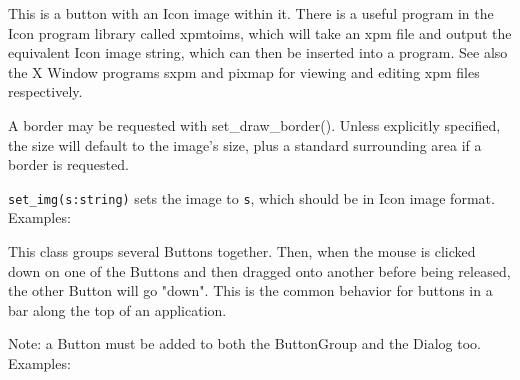 

This is a button with an Icon image within it. There is a useful program
in the Icon program library called xpmtoims, which will take an xpm
file and output the equivalent Icon image string, which can then be
inserted into a program. See also the X Window programs sxpm and pixmap
for viewing and editing xpm files respectively.

A border may be requested with set\_draw\_border(). Unless explicitly
specified, the size will default to the image's size,
plus a standard surrounding area if a border is requested.

\texttt{set\_img(s:string)} sets the image to \texttt{s}, which should
be in Icon image format. Examples:



This class groups several Buttons together. Then, when the mouse is
clicked down on one of the Buttons and then dragged onto another before
being released, the other Button will go
"down". This is the common behavior for
buttons in a bar along the top of an application.

Note: a Button must be added to both the ButtonGroup and the Dialog too.
Examples:

